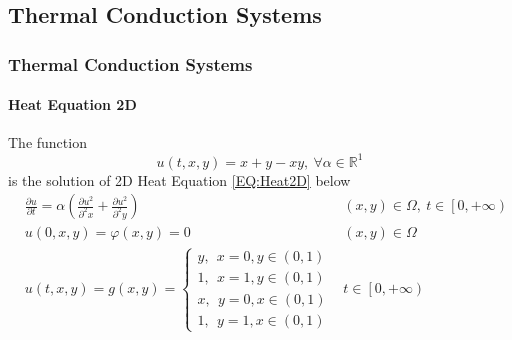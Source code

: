 \subsection{Thermal Conduction Systems}
\begin{frame}
  \frametitle{Thermal Conduction Systems}
  \framesubtitle{Heat Equation 2D}
  \begin{block}{}
    The function 
    \begin{equation}
      u(t,x,y) = x + y - xy, \:\forall \alpha \in \mathbb{R}^1
    \end{equation}
    is the solution of 2D Heat Equation \ref{EQ:Heat2D} below
    \begin{align}\label{EQ:Heat2D}
      &\frac{\partial u}{\partial t} = \alpha \left(
        \frac{\partial u^2}{\partial^2 x}
        +
        \frac{\partial u^2}{\partial^2 y}
      \right) &(x,y) \in \Omega, \: t \in \left[0, +\infty\right)  \nonumber\\
      &u(0,x,y)  = \varphi(x,y) = 0 &(x,y) \in \Omega\\
      &u(t,x,y)
       = g(x,y)
       = \begin{cases}
        y, \:\: x=0, y\in\left(0,1\right)\\
        1, \:\: x=1, y\in\left(0,1\right)\\
        x, \:\: y=0, x\in\left(0,1\right)\\
        1, \:\: y =1, x\in\left(0,1\right)
      \end{cases}
      &t \in \left[0, +\infty\right) \nonumber
    \end{align}
  \end{block}
\end{frame}


